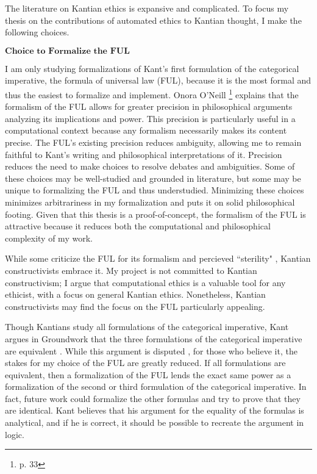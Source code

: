 %
\begin{isabellebody}%
%
%
\isadelimtheory
%
\endisadelimtheory
%
\isatagtheory
%
\endisatagtheory
{\isafoldtheory}%
%
\isadelimtheory
%
\endisadelimtheory
%
\begin{isamarkuptext}%
The literature on Kantian ethics is expansive and complicated. To focus my thesis on the contributions 
of automated ethics to Kantian thought, I make the following choices.

$\textbf{Choice to Formalize the FUL}$

I am only studying formalizations of Kant's first formulation of the categorical imperative,
the formula of universal law (FUL), because it is the most formal and thus the easiest to formalize and implement. 
Onora O'Neill \cite{actingonprinciple}\footnote{p. 33} explains that the formalism of the FUL allows 
for greater precision in philosophical arguments analyzing its implications and power. This precision 
is particularly useful in a computational context because any formalism necessarily makes its content 
precise. The FUL's existing precision reduces ambiguity, allowing me to remain faithful to Kant's writing and 
philosophical interpretations of it. Precision reduces the need to make choices to resolve debates 
and ambiguities. Some of these choices may be well-studied and grounded in literature, 
but some may be unique to formalizing the FUL and thus understudied. Minimizing these choices minimizes 
arbitrariness in my formalization and puts it on solid philosophical footing. Given that this thesis is a proof-of-concept, 
the formalism of the FUL is attractive because it reduces both the computational and philosophical complexity of my work. 

While some criticize the FUL for its formalism and percieved ``sterility" \cite{actingonprinciple}, 
Kantian constructivists embrace it. My project is not committed to Kantian constructivism; I argue that computational
ethics is a valuable tool for any ethicist, with a focus on general Kantian ethics. Nonetheless, Kantian constructivists may find the focus on 
the FUL particularly appealing. 

Though Kantians study all formulations of the categorical imperative, Kant argues in Groundwork 
that the three formulations of the categorical imperative are equivalent \cite{groundwork}. While this 
argument is disputed \cite{sepkant}, for those who believe it, the
stakes for my choice of the FUL are greatly reduced. If all formulations are equivalent, then a formalization of the FUL
lends the exact same power as a formalization of the second or third formulation of the categorical 
imperative. In fact, future work could formalize the other formulas and try to prove that they 
are identical. Kant believes that his argument for the equality of the formulas is analytical, and
if he is correct, it should be possible to recreate the argument in logic.


\end{isamarkuptext}
\end{isabellebody}
